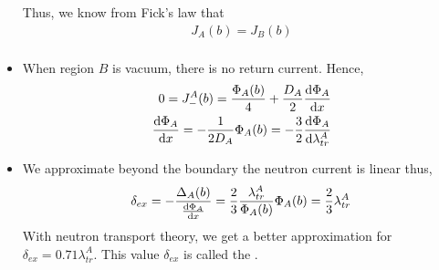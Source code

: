 \documentclass[a4paper]{article}
\begin{document}
\begin{itemize}
    Thus, we know from Fick's law that \begin{align}
        J_A(b)=J_B(b)\\
    \end{align}
    \item When region $B$ is vacuum, there is no return current. Hence, \begin{align}
        0=J_-^A(b)=\frac{\Phi_A(b)}{4}+\frac{D_A}{2}\derivative{\Phi_A}{x}(b)\\
        \derivative{\Phi_A}{x}(b)=-\frac{1}{2D_A}\Phi_A(b)=-\frac{3}{2}\derivative{\Phi_A}{\lambda_{tr}^A}(b)
    \end{align}
    \item We approximate beyond the boundary the neutron current is linear thus,\begin{align}
        \delta_{ex}=-\frac{\Delta_A(b)}{\derivative{\Phi_A}{x}(b)}=\frac{2}{3}\frac{\lambda_{tr}^A}{\Phi_A(b)}\Phi_A(b)=\frac{2}{3}\lambda_{tr}^A
    \end{align}
    With neutron transport theory, we get a better approximation for $\delta_{ex}=0.71\lambda_{tr}^A.$ This value $\delta_{ex}$ is called the .
\end{itemize}
\end{document}
